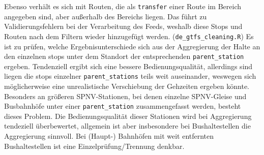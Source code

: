 \documentclass[11pt,a4paper]{scrartcl}
\begin{document}
    Ebenso verhält es sich mit Routen, die als \texttt{transfer} einer Route im Bereich angegeben sind, aber außerhalb des Bereichs liegen. Das führt zu Validierungsfehlern bei der Verarbeitung des Feeds, weshalb diese Stops und Routen nach dem Filtern wieder hinzugefügt werden. (\texttt{de\_gtfs\_cleaning.R}) Es ist zu prüfen, welche Ergebnisunterschiede sich aus der Aggregierung der Halte an den einzelnen stops unter dem Standort der entsprechenden \texttt{parent\_station} ergeben. Tendenziell ergibt sich eine bessere Bedienungsqualität, allerdings sind liegen die stops einzelner \texttt{parent\_stations} teils weit auseinander, weswegen sich möglicherweise eine unrealistische Verschiebung der Gehzeiten ergeben könnte. Besonders an größeren SPNV-Stationen, bei denen einzelne SPNV-Gleise und Busbahnhöfe unter einer \texttt{parent\_station} zusammengefasst werden, besteht dieses Problem. Die Bedienungsqualität dieser Stationen wird bei Aggregierung tendeziell überbewertet, allgemein ist aber insbesondere bei Bushaltestellen die Aggregierung sinnvoll. Bei (Haupt-) Bahnhöfen mit weit entfernten Bushaltestellen ist eine Einzelprüfung/Trennung denkbar.
        
\end{document}
